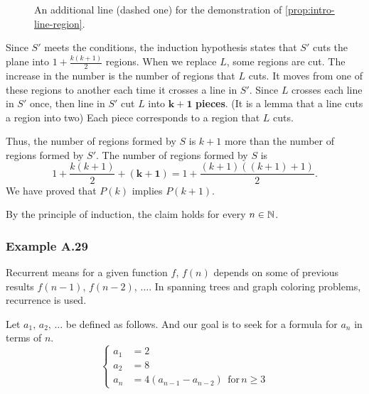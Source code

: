 \documentclass[../src/handouts/main.tex]{subfiles}
\begin{document}
\begin{figure}[htbp]
  \centering
  \caption{An additional line (dashed one) for the demonstration of \cref{prop:intro-line-region}.}
  \label{fig:intro-line-region-additional}
\end{figure}

Since $S'$ meets the conditions, the induction hypothesis states that $S'$ cuts the plane into $1 + \frac{k (k + 1)}{2}$ regions.
When we replace $L$, some regions are cut.
The increase in the number is the number of regions that $L$ cuts. It moves from one of these regions to another each time it crosses a line in $S'$.
Since $L$ crosses each line in $S'$ once, then line in $S'$ cut $L$ into $\bm{k + 1}$ \textbf{pieces}. (It is a lemma that a line cuts a region into two)
Each piece corresponds to a region that $L$ cuts.

Thus, the number of regions formed by $S$ is $k + 1$ more than the number of regions formed by $S'$.
The number of regions formed by $S$ is
$$
  1 + \frac{k (k + 1)}{2} + \bm{(k + 1)} = 1 + \frac{(k + 1)((k + 1) + 1)}{2}.
$$
We have proved that $P(k)$ implies $P(k + 1)$.

By the principle of induction, the claim holds for every $n \in \mathbb{N}$.


\subsubsection{Example A.29}

Recurrent means for a given function $f$, $f(n)$ depends on some of previous results $f(n - 1),\, f(n - 2),\, \ldots$. In spanning trees and graph coloring problems, recurrence is used.

Let $a_1,\, a_2,\, \ldots$ be defined as follows. And our goal is to seek for a formula for $a_n$ in terms of $n$.
$$
  \begin{cases}
    a_1 & = 2                                                   \\
    a_2 & = 8                                                   \\
    a_n & = 4 (a_{n - 1} - a_{n - 2}) \ \ \text{for}\, n \geq 3
  \end{cases}
$$
\end{document}

